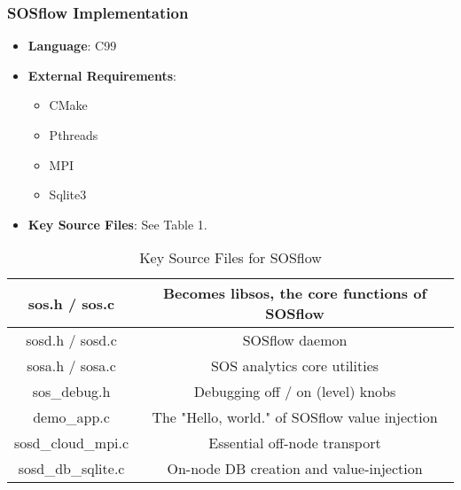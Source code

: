 \subsubsection{SOSflow Implementation}
\begin{itemize}
  \item \textbf{Language}: C99
   \item \textbf{External Requirements}:
   \begin{itemize}
    \item CMake
    \item Pthreads
    \item MPI
    \item Sqlite3
    \end{itemize}
  \item \textbf{Key Source Files}: See Table 1.
\end{itemize}

\begin{table}[!t]
\renewcommand{\arraystretch}{1.3}
\caption{Key Source Files for SOSflow}
\label{tableexample}
\centering
\begin{tabular}{|c|c|}
\hline %
sos.h / sos.c & Becomes libsos, the core functions of SOSflow\\
\hline %
sosd.h / sosd.c & SOSflow daemon\\
\hline %
sosa.h / sosa.c & SOS analytics core utilities\\
\hline %
sos\_debug.h & Debugging off / on (level) knobs\\
\hline %
demo\_app.c & The "Hello, world." of SOSflow value injection\\
\hline %
sosd\_cloud\_mpi.c & Essential off-node transport\\
\hline %
sosd\_db\_sqlite.c & On-node DB creation and value-injection\\
\hline %
\end{tabular}
\end{table}


